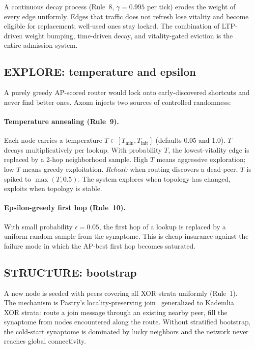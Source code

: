 \documentclass[conference]{IEEEtran}
\newcommand{\axona}{Axona\xspace}
\begin{document}
A continuous decay process (Rule~8, $\gamma = 0.995$ per tick)
erodes the weight of every edge uniformly.  Edges that traffic
does not refresh lose vitality and become eligible for
replacement; well-used ones stay locked.  The combination of
LTP-driven weight bumping, time-driven decay, and vitality-gated
eviction is the entire admission system.

\subsection{EXPLORE: temperature and epsilon}
\label{sec:axona-explore}

A purely greedy AP-scored router would lock onto
early-discovered shortcuts and never find better ones.  \axona
injects two sources of controlled randomness:

\paragraph{Temperature annealing (Rule~9).}
Each node carries a temperature $T \in [T_{\min},
T_{\mathrm{init}}]$ (defaults $0.05$ and $1.0$).  $T$ decays
multiplicatively per lookup.  With probability $T$, the
lowest-vitality edge is replaced by a 2-hop neighborhood sample.
High $T$ means aggressive exploration; low $T$ means greedy
exploitation.  \emph{Reheat:} when routing discovers a dead
peer, $T$ is spiked to $\max(T, 0.5)$.  The system explores
when topology has changed, exploits when topology is stable.

\paragraph{Epsilon-greedy first hop (Rule~10).}
With small probability $\epsilon = 0.05$, the first hop of a
lookup is replaced by a uniform random sample from the
synaptome.  This is cheap insurance against the failure mode in
which the AP-best first hop becomes saturated.

\subsection{STRUCTURE: bootstrap}
\label{sec:axona-structure}

A new node is seeded with peers covering all XOR strata
uniformly (Rule~1).  The mechanism is Pastry's
locality-preserving join~\cite{rowstron2001pastry} generalized
to Kademlia XOR strata: route a join message through an
existing nearby peer, fill the synaptome from nodes encountered
along the route.  Without stratified bootstrap, the cold-start
synaptome is dominated by lucky neighbors and the network never
reaches global connectivity.
\end{document}

